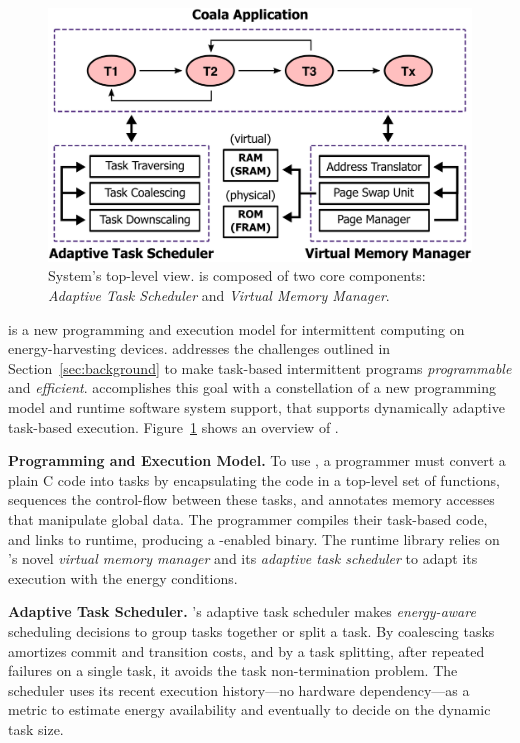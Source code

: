 \begin{figure}
	\centering
	\includegraphics[width=\columnwidth]{figures/overview.pdf}
	\caption{System's top-level view. \sys is composed of two core components: \emph{Adaptive Task Scheduler} and \emph{Virtual Memory Manager}.}
	\label{fig:system_overview}
\end{figure}
%
\sys is a new programming and execution model for intermittent computing on energy-harvesting devices. \sys addresses the challenges outlined in Section~\ref{sec:background} to make task-based intermittent programs {\em programmable} and {\em efficient}. \sys accomplishes this goal with a constellation of a new programming model and runtime software system support, that supports dynamically adaptive task-based execution. Figure~\ref{fig:system_overview} shows an overview of \sys.

\textbf{Programming and Execution Model.}  To use \sys, a programmer must convert a plain C code into tasks by encapsulating the code in a top-level set of functions, sequences the control-flow between these tasks, and annotates memory accesses that manipulate global data.
The programmer compiles their task-based code, and links to \sys runtime,
producing a \sys-enabled binary. The runtime library relies on \sys's novel
{\em virtual memory manager} and its {\em adaptive task scheduler} to adapt its execution with the energy conditions.

\textbf{Adaptive Task Scheduler.} 
\sys's adaptive task scheduler makes \emph{energy-aware} scheduling decisions to group tasks together or split a task. By coalescing tasks \sys amortizes commit and transition costs, and by a task splitting, after repeated failures on a single task, it avoids the task non-termination problem. The scheduler uses its recent execution history---no hardware dependency---as a metric to estimate energy availability and eventually to decide on the dynamic task size. 

